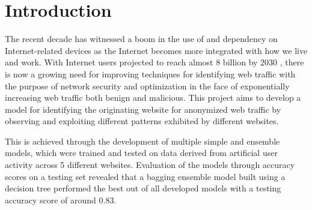 \documentclass[10pt,sigconf,letterpaper,nonacm]{acmart}
\begin{document}
\title{\PaperTitle}

\author{Charles Hu}

\begin{abstract}
  In this project, we address the task of identifying the originating website given some anonymized web traffic for the purposes of gaining new insights for improving network security and optimization.
  We construct a data set of TCP streams sourced from 5 different websites: github.com, google.com, reuters.com, wikipedia.org, and youtube.com.
  With this, we develop and test 15 different machine learning models based on simple and ensemble model designs.
  We determine that a bagging ensemble model built using a decision tree provides the best performance with an accuracy score of 0.83 on the testing set, demonstrate the capabilities of ensemble models, and note the implication that web traffic data may be distinctive and generally non-overlapping.
  Challenges to this project are then analyzed and addressed with potential future avenues for improvement.
\end{abstract}


\maketitle

\section{Introduction}

The recent decade has witnessed a boom in the use of and dependency on Internet-related devices as the Internet becomes more integrated with how we live and work.
With Internet users projected to reach almost 8 billion by 2030 \cite{forbes}, there is now a growing need for improving techniques for identifying web traffic with the purpose of network security and optimization \cite{traffic} in the face of exponentially increasing web traffic both benign and malicious.
This project aims to develop a model for identifying the originating website for anonymized web traffic by observing and exploiting different patterns exhibited by different websites.

This is achieved through the development of multiple simple and ensemble models, which were trained and tested on data derived from artificial user activity across 5 different websites.
Evaluation of the models through accuracy scores on a testing set revealed that a bagging ensemble model built using a decision tree performed the best out of all developed models with a testing accuracy score of around 0.83.
\end{document}
